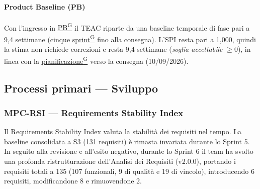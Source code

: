 \documentclass[a4paper,12pt]{article}
\providecommand{\glslink}[2]{\href{https://alittlebyte-19.github.io/Documentazione/glossario.html\#gls-#1}{\underline{#2}\textsuperscript{\scriptsize G}}}
\begin{document}
\paragraph*{Product Baseline (PB)} Con l'ingresso in \glslink{pb-product-baseline}{PB} il TEAC riparte da una baseline temporale di fase pari a 9,4 settimane (cinque \glslink{sprint}{sprint} fino alla consegna). L'SPI resta pari a 1,000, quindi la stima non richiede correzioni e resta 9,4 settimane (\emph{soglia accettabile} $\geq 0$), in linea con la \glslink{pianificazione}{pianificazione} verso la consegna (10/09/2026).

\subsection{Processi primari — Sviluppo}

\subsubsection{MPC-RSI — Requirements Stability Index}

Il Requirements Stability Index valuta la stabilità dei requisiti nel tempo. La baseline consolidata a S3 (131 requisiti) è rimasta invariata durante lo Sprint 5. In seguito alla revisione e all'esito negativo, durante lo Sprint 6 il team ha svolto una profonda ristrutturazione dell'Analisi dei Requisiti (v2.0.0), portando i requisiti totali a 135 (107 funzionali, 9 di qualità e 19 di vincolo), introducendo 6 requisiti, modificandone 8 e rimuovendone 2.
\end{document}
